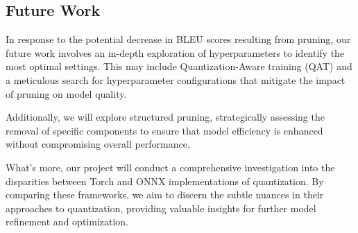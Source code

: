 \documentclass[11pt]{article}
\begin{document}
\subsection{Future Work}
In response to the potential decrease in BLEU scores resulting from pruning, our future work involves an in-depth exploration of hyperparameters to identify the most optimal settings. This may include Quantization-Aware training (QAT) and a meticulous search for hyperparameter configurations that mitigate the impact of pruning on model quality. 

Additionally, we will explore structured pruning, strategically assessing the removal of specific components to ensure that model efficiency is enhanced without compromising overall performance. 

What's more, our project will conduct a comprehensive investigation into the disparities between Torch and ONNX implementations of quantization. By comparing these frameworks, we aim to discern the subtle nuances in their approaches to quantization, providing valuable insights for further model refinement and optimization.





\end{document}
